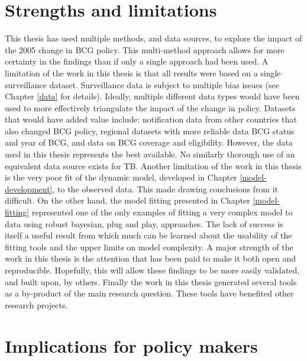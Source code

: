 \documentclass[11pt,twoside]{bristolthesis}
\begin{document}
  \hypertarget{strengths-and-limitations}{%
  \section{Strengths and limitations}\label{strengths-and-limitations}}
  
  This thesis has used multiple methods, and data sources, to explore the impact of the 2005 change in BCG policy. This multi-method approach allows for more certainty in the findings than if only a single approach had been used. A limitation of the work in this thesis is that all results were based on a single surveillance dataset. Surveillance data is subject to multiple bias issues (see Chapter \ref{data} for details). Ideally, multiple different data types would have been used to more effectively triangulate the impact of the change in policy. Datasets that would have added value include: notification data from other countries that also changed BCG policy, regional datasets with more reliable data BCG status and year of BCG, and data on BCG coverage and eligibility. However, the data used in this thesis represents the best available. No similarly thorough use of an equivalent data source exists for TB. Another limitation of the work in this thesis is the very poor fit of the dynamic model, developed in Chapter \ref{model-development}, to the observed data. This made drawing conclusions from it difficult. On the other hand, the model fitting presented in Chapter \ref{model-fitting} represented one of the only examples of fitting a very complex model to data using robust bayesian, plug and play, approaches. The lack of success is itself a useful result from which much can be learned about the usability of the fitting tools and the upper limits on model complexity. A major strength of the work in this thesis is the attention that has been paid to make it both open and reproducible. Hopefully, this will allow these findings to be more easily validated, and built upon, by others. Finally the work in this thesis generated several tools as a by-product of the main research question. These tools have benefited other research projects.
  
  \hypertarget{implications-for-policy-makers}{%
  \section{Implications for policy makers}\label{implications-for-policy-makers}}
  
\end{document}
